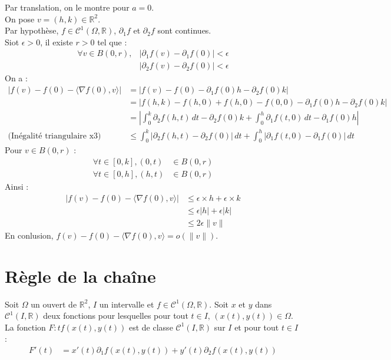 \documentclass[../main.tex]{subfiles}
\begin{document}
\noindent Par translation, on le montre pour $a = 0$. \\
On pose $v = (h, k)\in \mathbb{R}^2$. \\
Par hypothèse, $f\in \mathcal{C}^1(\Omega, \mathbb{R})$, $\partial_1f$ et $\partial_2f$ sont continues. \\
Siot $\epsilon > 0$, il existe $r > 0$ tel que :
\begin{align*}
    \forall v\in B(0, r), &|\partial_1f(v) - \partial_1f(0)| < \epsilon \\
    &|\partial_2f(v) - \partial_2f(0)| < \epsilon
\end{align*}
On a : 
\begin{align*}
    |f(v) - f(0) - \langle \nabla f(0), v\rangle| &= |f(v) - f(0) - \partial_1f(0)h - \partial_2f(0)k| \\
    &= |f(h, k) - f(h, 0) + f(h, 0) - f(0, 0) - \partial_1f(0)h - \partial_2f(0)k| \\
    &= \left| \int_{0}^{k} \partial_2 f(h, t) \,dt - \partial_2 f(0) k + \int_{0}^{h} \partial_{1} f(t, 0) \,dt - \partial_1 f(0) h \right| \\
    \text{(Inégalité triangulaire x3)}\quad &\leq \int_{0}^{k} |\partial_2 f(h, t) - \partial_2 f(0)| \,dt+ \int_{0}^{h} |\partial_{1} f(t, 0) - \partial_1 f(0)| \,dt
\end{align*}
Pour $v\in B(0, r)$ : 
\begin{align*}
    \forall t\in [0, k], (0, t) &\in B(0, r) \\
    \forall t\in [0, h], (h, t) &\in B(0, r)
\end{align*}
Ainsi : 
\begin{align*}
    |f(v) - f(0) - \langle \nabla f(0), v\rangle| &\leq \epsilon \times h + \epsilon \times k \\
    &\leq \epsilon |h| + \epsilon |k| \\
    &\leq 2\epsilon \|v\|
\end{align*}
En conlusion, $f(v) - f(0) - \langle \nabla f(0), v\rangle = o(\|v\|)$. 

\section{Règle de la chaîne}
\begin{tcolorbox}[title=Théorème 36.42, title filled=false, colframe=orange, colback=orange!10!white]
    Soit $\Omega$ un ouvert de $\mathbb{R}^2$, $I$ un intervalle et $f\in \mathcal{C}^1(\Omega, \mathbb{R})$. Soit $x$ et $y$ dans $\mathcal{C}^1(I, \mathbb{R})$ deux fonctions pour lesquelles pour tout $t\in I$, $(x(t), y(t))\in \Omega$. \\
    La fonction $F:t f(x(t), y(t))$ est de classe $\mathcal{C}^1(I, \mathbb{R})$ sur $I$ et pour tout $t\in I$ : 
    \begin{align*}
        F'(t) &= x'(t) \partial_1 f(x(t), y(t)) + y'(t) \partial_2 f(x(t), y(t))
    \end{align*}
\end{tcolorbox}
\end{document}

